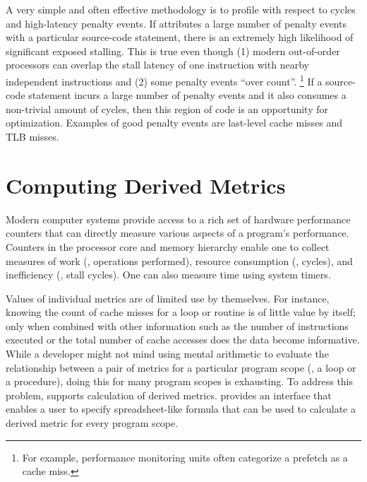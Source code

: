 \documentclass[11pt,twoside,letterpaper]{report}
\begin{document}
A very simple and often effective methodology is to profile with respect to cycles and high-latency penalty events.
If \HPCToolkit{} attributes a large number of penalty events with a particular source-code statement, there is an extremely high likelihood of significant exposed stalling.
This is true even though (1) modern out-of-order processors can overlap the stall latency of one instruction with nearby independent instructions and (2) some penalty events ``over count''.%
\footnote{For example, performance monitoring units often categorize a prefetch as a cache miss.}
If a source-code statement incurs a large number of penalty events and it also consumes a non-trivial amount of cycles, then this region of code is an opportunity for optimization.
Examples of good penalty events are last-level cache misses and TLB misses.



\section{Computing Derived Metrics}
\label{sec:effective-performance-analysis:derived-metrics}

Modern computer systems provide access to a rich set of hardware performance counters that can directly measure various aspects of a program's performance.
Counters in the processor core and memory hierarchy enable one to collect measures of work (\eg, operations performed), resource consumption (\eg, cycles), and inefficiency (\eg, stall cycles).
One can also measure time using system timers.

Values of individual metrics are of limited use by themselves.
For instance, knowing the count of cache misses for a loop or routine is of little value by itself; only when combined with other information such as the number of instructions executed or the total number of cache accesses does the data become informative.
While a developer might not mind using mental arithmetic to evaluate the relationship between a pair of metrics for a particular program scope (\eg, a loop or a procedure), doing this for many program scopes is exhausting.
To address this problem, \hpcviewer{} supports calculation of derived metrics.
\hpcviewer{} provides an interface that enables a user to specify spreadsheet-like formula that can be used to calculate a derived metric for every program scope.
\end{document}
